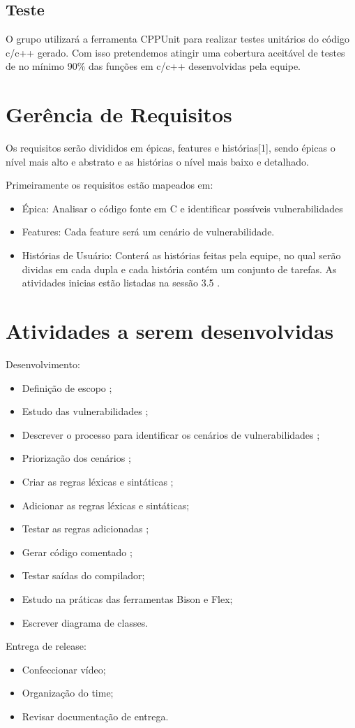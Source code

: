 \subsection{Teste}
O grupo utilizará a ferramenta CPPUnit para realizar testes unitários do código c/c++ gerado. Com isso pretendemos atingir uma cobertura aceitável de testes de no mínimo 90\% das funções em c/c++ desenvolvidas pela equipe.

\section{Gerência de Requisitos}
Os requisitos serão divididos em épicas, features e histórias[1], sendo épicas o nível mais alto e abstrato e as histórias o nível mais baixo e detalhado.

Primeiramente os requisitos estão mapeados em:
\begin{itemize}
\item Épica: Analisar o código fonte em C e identificar possíveis vulnerabilidades
\item Features: Cada feature será um cenário de vulnerabilidade.
\item  Histórias de Usuário: Conterá as histórias feitas pela equipe, no qual serão dividas em cada dupla e cada história contém um conjunto de tarefas. As atividades inicias estão listadas na sessão 3.5 .
\end{itemize}

\section{Atividades a serem desenvolvidas}
Desenvolvimento:	
\begin{itemize}
\item Definição de escopo ;
\item Estudo das vulnerabilidades ;
\item Descrever o processo para identificar os cenários de vulnerabilidades ;
\item Priorização dos cenários ;
\item Criar as regras léxicas e sintáticas ;
\item Adicionar as regras léxicas e sintáticas;
\item Testar as regras adicionadas ;
\item Gerar código comentado ;
\item Testar saídas do compilador;
\item Estudo na práticas das ferramentas Bison e Flex;
\item Escrever diagrama de classes.
\end{itemize}

Entrega de release:
\begin{itemize}
\item Confeccionar vídeo;
\item Organização do time;
\item Revisar documentação de entrega.
\end{itemize} 